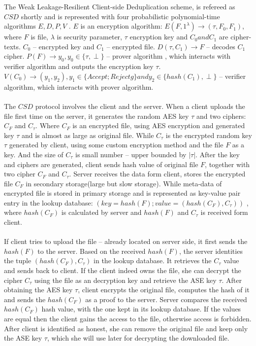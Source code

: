\documentclass[12pt]{article}
\begin{document}
The Weak Leakage-Resilient Client-side Deduplication scheme, is refereed as $CSD$ shortly and is represented with four probabilistic polynomial-time algorithms $E, D, P, V$ .  $E$ is an encryption algorithm: $E(F,1^\lambda) 	\rightarrow (\tau, F_0, F_1)$, where $F$ is file, $\lambda$ is security parameter, $\tau$ encryption key and $C_0 and C_1$ are cipher-texts. $C_0$ -- encrypted key and $C_1$ -- encrypted file. $D(\tau,C_1) \rightarrow F $ -- decodes $C_1$ cipher. $P(F) \rightarrow y_0,  y_0 \in \{\tau,\perp\} $ -- prover algorithm , which interacts with verifier algorithm and outputs the encryption key $\tau$. $V(C_0) \rightarrow (y_1,y_2), y_1 \in \{Accept; Rejectg\} and y_2 \in \{hash(C_1),\perp \}$ -- verifier algorithm, which interacts with prover algorithm.\\\\
The $CSD$ protocol involves the client and the server. When a client uploads the file first time on the server, it generates the random AES\cite{AES} key $\tau$ and two ciphers: $C_F$ and $C_\tau$. Where $C_F$ is an encrypted file, using AES encryption and generated  key $\tau$  and is almost as large as original file. While  $C_\tau$ is the encrypted random key $\tau$ generated by client, using some custom encryption method and the file $F$ as a key. And the size of $C_\tau$ is small number -- upper bounded by $|\tau|$. After the key and ciphers are generated, client sends hash value of original file $F$, together with two cipher $C_F$ and $C_\tau$.  Server receives the data form client, stores the encrypted file $C_F$ in secondary storage(large but slow storage). While meta-data of encrypted file is stored in primary storage and is represented as key-value pair entry in the lookup database: $(key = hash(F); value = (hash(C_F), C_\tau))$ , where $hash(C_F)$ is calculated by server and $hash(F)$ and $C_\tau$ is received form client.\\\\
If client tries to upload the file -- already located on server side, it first sends the $hash(F)$ to the server.  Based on the received $hash(F)$, the server identities  the tuple $(hash(C_F),C_\tau)$ in the lookup database. It retrieves the $C_\tau$ value and sends back to client. If the client indeed owns the file, she can decrypt the cipher $C_\tau$ using the file as an decryption key and retrieve the ASE key $\tau$. After obtaining the AES key $\tau$, client encrypts the original file, computes the hash of it and sends the $hash(C_F)$ as a proof to the server. Server compares the received $hash(C_F)$ hash value, with the one kept in its lookup database. If the values are equal then the client gains the access to the file, otherwise access is forbidden. After client is identified as honest, she can remove the original file and keep only the ASE key $\tau$, which she will use later for decrypting the downloaded file.\\\\
\end{document}
